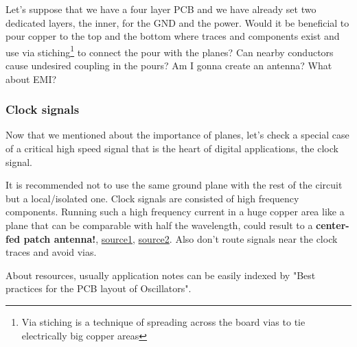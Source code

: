 \documentclass[12pt]{article}
\begin{document}
Let's suppose that we have a four layer PCB and we have already set two dedicated layers, the inner, for the GND and the power. Would it be beneficial to pour copper to the top and the bottom where traces and components exist and use via stiching\footnote{Via stiching is a technique of spreading across the board vias to tie electrically big copper areas} to connect the pour with the planes? Can nearby conductors cause undesired coupling in the pours? Am I gonna create an antenna? What about EMI?

\subsubsection{Clock signals}

Now that we mentioned about the importance of planes, let's check a special case of a critical high speed signal that is the heart of digital applications, the clock signal.

It is recommended not to use the same ground plane with the rest of the circuit but a local/isolated one. Clock signals are consisted of high frequency components. Running such a high frequency current in a huge copper area like a plane that can be comparable with half the wavelength, could result to a \textbf{center-fed patch antenna!}, \href{https://electronics.stackexchange.com/questions/15135/decoupling-caps-pcb-layout/15143#15143}{source1}, \href{https://electronics.stackexchange.com/questions/39136/competing-pcb-crystal-layout-recommendations}{source2}. Also don't route signals near the clock traces and avoid vias.

About resources, usually application notes can be easily indexed by "Best practices for the PCB layout of Oscillators".



\end{document}
